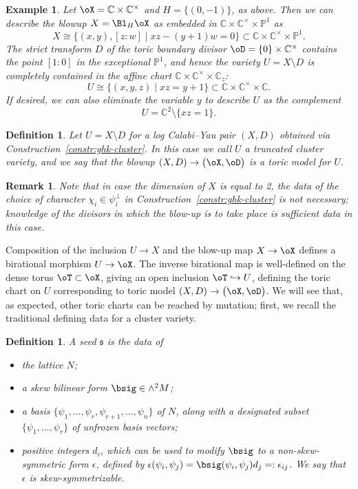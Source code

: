 \documentclass[10pt,a4paper]{amsart}
\numberwithin{equation}{section}
\newtheorem{Definition}[Theorem]{Definition}
\newtheorem{Example}[Theorem]{Example}
\newtheorem{Remark}[Theorem]{Remark} }
\def\CC{\mathbb{C}}
\def\PP{\mathbb{P}}
\newcommand\frs{\mathfrak{s}}
\begin{document}
\begin{Example}\label{ex:bside-ex1}
 Let $\oX = \CC\times \CC^\times$ and $H=\{(0,-1)\}$, as above. Then we can describe the blowup $X = \Bl_H\oX$ as embedded in $\CC\times\CC^\times\times \PP^1$ as
 \[
 X \cong \{(x,y),[z:w]\mid xz-(y+1)w =0\}\subset \CC\times\CC^\times\times\PP^1.
 \]
 The strict transform $D$ of the toric boundary divisor $\oD = \{0\}\times \CC^\times$ contains the point $[1:0]$ in the exceptional $\PP^1$, and hence the variety $U=X\setminus D$ is completely contained in the affine chart $\CC\times\CC^\times\times \CC_z$:
 \[
 U \cong \{(x,y,z)\mid xz = y+1\}\subset \CC\times \CC^\times\times \CC.
 \]
 If desired, we can also eliminate the variable $y$ to describe $U$ as the complement
 \[U=\CC^2\setminus \{xz=1\}.\]
\end{Example}

\begin{Definition}\label{def:toricmodel}
 Let $U = X\setminus D$ for a log Calabi--Yau pair $(X,D)$ obtained via Construction~\ref{constr:ghk-cluster}. In this case we call $U$ a {\em truncated cluster variety}, and we say that the blowup $(X,D)\to \big(\oX,\oD\big)$ is a {\em toric model} for $U$.
\end{Definition}

\begin{Remark} Note that in case the dimension of $X$ is equal to 2, the data of the choice of character $\chi_i\in \psi_i^\perp$ in Construction~\ref{constr:ghk-cluster} is not necessary; knowledge of the divisors in which the blow-up is to take place is sufficient data in this case.
\end{Remark}

Composition of the inclusion $U\to X$ and the blow-up map $X\to \oX$ defines a birational morphism $U\to \oX$. The inverse birational map is well-defined on the dense torus $\oT\subset \oX$, giving an open inclusion $\oT\hookrightarrow U$, defining the toric chart on $U$ corresponding to toric model $(X,D)\to\big(\oX,\oD\big)$. We will see that, as expected, other toric charts can be reached by mutation; first, we recall the traditional defining data for a cluster variety.

\begin{Definition}\label{def:seed}
 A {\em seed} $\frs$ is the data of
 \begin{itemize}\itemsep=0pt
 \item the lattice $N$;
 \item a skew bilinear form $\bsig\in \wedge^2 M$;
 \item a basis $\{\psi_1,\dots,\psi_r,\psi_{r+1},\dots,\psi_n\}$ of $N$, along with a designated subset $\{\psi_1,\dots,\psi_r\}$ of {\em unfrozen} basis vectors;
 \item positive integers $d_i$, which can be used to modify $\bsig$ to a non-skew-symmetric form $\epsilon$, defined by $\epsilon(\psi_i,\psi_j)=\bsig(\psi_i,\psi_j)d_j=:\epsilon_{ij}$. We say that $\epsilon$ is \emph{skew-symmetrizable}.
 \end{itemize}
\end{Definition}
\end{document}
